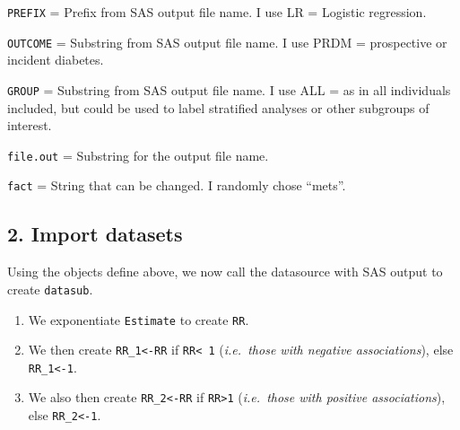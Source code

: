 \documentclass[
]{article}
\providecommand{\tightlist}{%
  \setlength{\itemsep}{0pt}\setlength{\parskip}{0pt}}
\begin{document}
\texttt{PREFIX} = Prefix from SAS output file name. I use LR = Logistic
regression.

\texttt{OUTCOME} = Substring from SAS output file name. I use PRDM =
prospective or incident diabetes.

\texttt{GROUP} = Substring from SAS output file name. I use ALL = as in
all individuals included, but could be used to label stratified analyses
or other subgroups of interest.

\texttt{file.out} = Substring for the output file name.

\texttt{fact} = String that can be changed. I randomly chose ``mets''.

\hypertarget{import-datasets}{%
\subsection{2. Import datasets}\label{import-datasets}}

Using the objects define above, we now call the datasource with SAS
output to create \texttt{datasub}.

\begin{enumerate}
\def\labelenumi{\arabic{enumi}.}
\tightlist
\item
  We exponentiate \texttt{Estimate} to create \texttt{RR}.\\
\item
  We then create \texttt{RR\_1\textless{}-RR} if
  \texttt{RR\textless{}\ 1} (\emph{i.e.~those with negative
  associations}), else \texttt{RR\_1\textless{}-1}.\\
\item
  We also then create \texttt{RR\_2\textless{}-RR} if
  \texttt{RR\textgreater{}1} (\emph{i.e.~those with positive
  associations}), else \texttt{RR\_2\textless{}-1}.
\end{enumerate}
\end{document}
